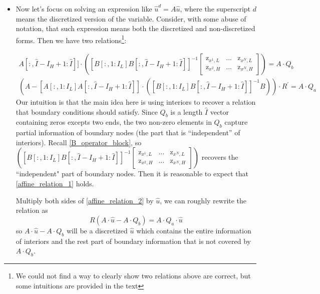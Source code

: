 \documentclass[11pt]{article}
\begin{document}
\begin{itemize}
		\item Now let's focus on solving an expression like $\hat{u}^d = A \hat{u}$, where the superscript $d$ means the discretized version of the variable. Consider, with some abuse of notation, that such expression means both the discretized and non-discretized forms. Then we have two relations\footnote{We could not find a way to clearly show two relations above are correct, but some intuitions are provided in the text}:
		
		\begin{align}
		[A[:, 1:I_L] A[:,\hat{I}-I_H+1:\hat{I}]]\cdot\left([B[:,1:I_L] B[:,\hat{I}-I_H+1:\hat{I}]]^{-1}\begin{bmatrix}
		\text{z}_{x^{1},L} & ... & \text{z}_{x^{N},L}\\
		\text{z}_{x^{2},H} & ... & \text{z}_{x^{N},H}
		\end{bmatrix}\right) = A\cdot Q_b\label{affine_relation_1}
		\end{align}
		\begin{align}
		(A-[A[:,1:I_L] A[:,\hat{I}-I_H+1:\hat{I}]]\cdot([B[:,1:I_L] B[:,\hat{I}-I_H+1:\hat{I}]]^{-1} B))\cdot R^{'} = A\cdot Q_a\label{affine_relation_2}
		\end{align}		
Our intuition is that the main idea here is using interiors to recover a relation that boundary conditions should satisfy. Since $Q_b$ is a length $\hat{I}$ vector containing zeros excepts two ends, the two non-zero elements in $Q_b$ capture partial information of boundary nodes (the part that is ``independent'' of interiors).  Recall \eqref{B_operator_block}, so $\left([B[:,1:I_L] B[:,\hat{I}-I_H+1:\hat{I}]]^{-1}\begin{bmatrix}
		\text{z}_{x^{1},L} & ... & \text{z}_{x^{N},L}\\
		\text{z}_{x^{2},H} & ... & \text{z}_{x^{N},H}
		\end{bmatrix}\right)$ recovers the ``independent" part of boundary nodes. Then it is reasonable to expect that \eqref{affine_relation_1} holds.
		
		Multiply both sides of \eqref{affine_relation_2} by $\hat{u}$, we can roughly rewrite the relation as
		\begin{equation}
		R(A\cdot \hat{u}-A\cdot Q_b) = A\cdot Q_a\cdot \hat{u}
		\end{equation}
		so $A\cdot \hat{u}-A\cdot Q_b$ will be a discretized $\hat{u}$ which contains the entire information of interiors and the rest part of boundary information that is not covered by $A\cdot Q_b$. 
		

\end{itemize}
\end{document}
